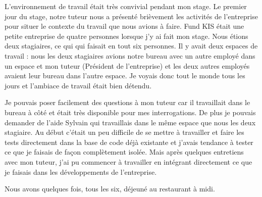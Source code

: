 L'environnement de travail était très convivial pendant mon stage. Le premier jour du stage, notre tuteur nous a présenté brièvement les activités de l'entreprise pour situer le contexte du travail que nous avions à faire. Fund KIS était une petite entreprise de quatre personnes lorsque j'y ai fait mon stage. Nous étions deux stagiaires, ce qui qui faisait en tout six personnes. Il y avait deux espaces de travail : nous les deux stagiaires avions notre bureau avec un autre employé dans un espace et mon tuteur (Président de l'entreprise) et les deux autres employés avaient leur bureau dans l'autre espace. Je voyais donc tout le monde tous les jours et l'ambiace de travail était bien détendu.

\vspace{3mm}

Je pouvais poser facilement des questions à mon tuteur car il travaillait dans le bureau à côté et était très disponible pour mes interrogations. De plus je pouvais demander de l'aide Sylvain qui travaillais dans le même espace que nous les deux stagiaire. Au début c'était un peu difficile de se mettre à travailler et faire les tests directement dans la base de code déjà existante et j'avais tendance à tester ce que je faisais de façon complètement isolée. Mais après quelques entretiens avec mon tuteur, j'ai pu commencer à travailler en intégrant directement ce que je faisais dans les développements de l'entreprise.

\vspace{3mm}

Nous avons quelques fois, tous les six, déjeuné au restaurant à midi.
